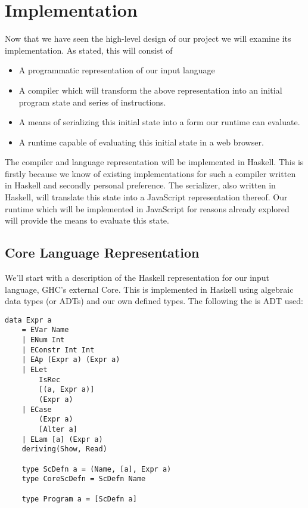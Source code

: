 \section{Implementation}
Now that we have seen the high-level design of our project we will
examine its implementation. As stated, this will consist of

\begin{itemize}
    \item A programmatic representation of our input language
    \item A compiler which will transform the above representation
          into an initial program state and series of instructions.
    \item A means of serializing this initial state into a form our
          runtime can evaluate.
    \item A runtime capable of evaluating this initial state in a
          web browser.
\end{itemize}

The compiler and language representation will be implemented in
Haskell. This is firstly because we know of existing implementations
for such a compiler written in Haskell and secondly personal 
preference. The serializer, also written in Haskell, will translate
this state into a JavaScript representation thereof. Our runtime
which will be implemented in JavaScript for reasons already explored
will provide the means to evaluate this state. 

\subsection{Core Language Representation}
We'll start with a description of the Haskell representation for
our input language, GHC's external Core. This is implemented in
Haskell using algebraic data types (or ADTs) and our own defined
types. The following the is ADT used:

\begin{verbatim}
data Expr a 
    = EVar Name
    | ENum Int
    | EConstr Int Int
    | EAp (Expr a) (Expr a)
    | ELet 
        IsRec
        [(a, Expr a)]
        (Expr a)
    | ECase
        (Expr a)
        [Alter a]
    | ELam [a] (Expr a)
    deriving(Show, Read)

    type ScDefn a = (Name, [a], Expr a)
    type CoreScDefn = ScDefn Name

    type Program a = [ScDefn a]
\end{verbatim}

